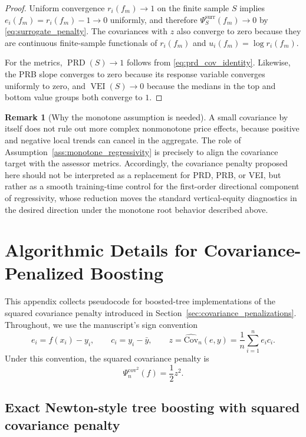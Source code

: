\documentclass[12pt, draft]{article}
\theoremstyle{plain}
\theoremstyle{definition}
\newtheorem{remark}{Remark}
\newcommand{\1}{\mathbf{1}}
\newcommand{\Cov}{\text{Cov}}
\begin{document}
\begin{proof}
Uniform convergence $r_i(f_m)\to 1$ on the finite sample $S$ implies $e_i(f_m)=r_i(f_m)-1\to 0$ uniformly, and therefore $\Psi_S^{\mathrm{surr}}(f_m)\to 0$ by \eqref{eq:surrogate_penalty}. The covariances with $z$ also converge to zero because they are continuous finite-sample functionals of $r_i(f_m)$ and $u_i(f_m)=\log r_i(f_m)$.

For the metrics, $\operatorname{PRD}(S)\to 1$ follows from \eqref{eq:prd_cov_identity}. Likewise, the PRB slope converges to zero because its response variable converges uniformly to zero, and $\operatorname{VEI}(S)\to 0$ because the medians in the top and bottom value groups both converge to $1$.
\end{proof}

\begin{remark}[Why the monotone assumption is needed]
\label{rem:cov_not_sufficient}
A small covariance by itself does not rule out more complex nonmonotone price effects, because positive and negative local trends can cancel in the aggregate. The role of Assumption~\ref{ass:monotone_regressivity} is precisely to align the covariance target with the assessor metrics. Accordingly, the covariance penalty proposed here should not be interpreted as a replacement for PRD, PRB, or VEI, but rather as a smooth training-time control for the first-order directional component of regressivity, whose reduction moves the standard vertical-equity diagnostics in the desired direction under the monotone root behavior described above.
\end{remark}




\section{Algorithmic Details for Covariance-Penalized Boosting}
\label{app:boosting_algorithms}

This appendix collects pseudocode for boosted-tree implementations of the squared covariance penalty introduced in Section~\ref{sec:covariance_penalizations}. Throughout, we use the manuscript's sign convention
\[
e_i = f(x_i)-y_i,
\qquad
c_i = y_i-\bar y,
\qquad
z = \widehat{\Cov}_n(e,y)=\frac{1}{n}\sum_{i=1}^n e_i c_i.
\]
Under this convention, the squared covariance penalty is
\[
\Psi_n^{\mathrm{cov}^2}(f)=\frac{1}{2}z^2.
\]

\subsection{Exact Newton-style tree boosting with squared covariance penalty}
\label{app:exact_newton_cov_boosting}
\end{document}
